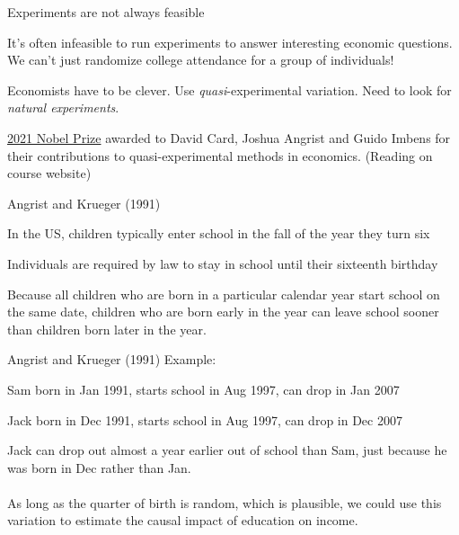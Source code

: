 \documentclass{./../div_teaching_slides}
\begin{document}
\begin{frame}{Experiments are not always feasible}
\begin{witemize}
  \item It's often infeasible to run experiments to answer interesting economic questions. We can't just randomize college attendance for a group of individuals!
  \item Economists have to be clever. Use \textit{quasi}-experimental variation. Need to look for \textit{natural experiments}.
  \item \href{https://www.nobelprize.org/prizes/economic-sciences/2021/press-release/}{2021 Nobel Prize} awarded to David Card, Joshua Angrist and Guido Imbens for their contributions to quasi-experimental methods in economics. (Reading on course website)
\end{witemize}
\end{frame}

\begin{frame}{Angrist and Krueger (1991)}
\begin{witemize}
  \item In the US, children typically enter school in the fall of the year they turn six 
  \item Individuals are required by law to stay in school until their sixteenth birthday
  \item Because all children who are born in a particular calendar year start school on the same date, children who are born early in the year can leave school sooner than children born later in the year.
\end{witemize}
\end{frame}

\begin{frame}{Angrist and Krueger (1991)}
Example: \\
\begin{witemize}
  \item Sam born in Jan 1991, starts school in Aug 1997, can drop in Jan 2007
  \item Jack born in Dec 1991, starts school in Aug 1997, can drop in Dec 2007 
\end{witemize}
Jack can drop out almost a year earlier out of school than Sam, just because he was born in Dec rather than Jan. \\~\\
As long as the quarter of birth is random, which is plausible, we could use this variation to estimate the causal impact of education on income. 
\end{frame}
\end{document}
